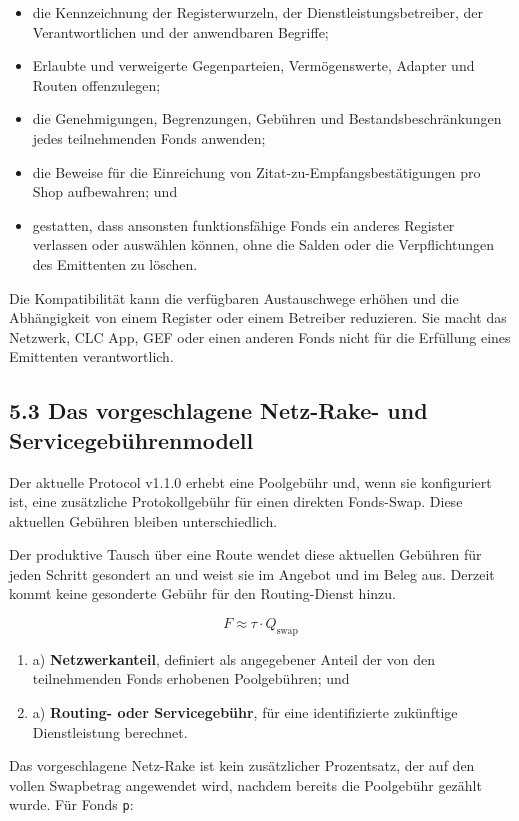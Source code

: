 \documentclass[11pt]{article}
\begin{document}
\begin{itemize}[leftmargin=*]
\item die Kennzeichnung der Registerwurzeln, der Dienstleistungsbetreiber, der Verantwortlichen und der anwendbaren Begriffe;
\item Erlaubte und verweigerte Gegenparteien, Vermögenswerte, Adapter und Routen offenzulegen;
\item die Genehmigungen, Begrenzungen, Gebühren und Bestandsbeschränkungen jedes teilnehmenden Fonds anwenden;
\item die Beweise für die Einreichung von Zitat-zu-Empfangsbestätigungen pro Shop aufbewahren; und
\item gestatten, dass ansonsten funktionsfähige Fonds ein anderes Register verlassen oder auswählen können, ohne die Salden oder die Verpflichtungen des Emittenten zu löschen.
\end{itemize}
Die Kompatibilität kann die verfügbaren Austauschwege erhöhen und die Abhängigkeit von einem Register oder einem Betreiber reduzieren. Sie macht das Netzwerk, CLC App, GEF oder einen anderen Fonds nicht für die Erfüllung eines Emittenten verantwortlich.

\subsection*{5.3 Das vorgeschlagene Netz-Rake- und Servicegebührenmodell}

Der aktuelle Protocol v1.1.0 erhebt eine Poolgebühr und, wenn sie konfiguriert ist, eine zusätzliche Protokollgebühr für einen direkten Fonds-Swap. Diese aktuellen Gebühren bleiben unterschiedlich.

Der produktive Tausch über eine Route wendet diese aktuellen Gebühren für jeden Schritt gesondert an und weist sie im Angebot und im Beleg aus. Derzeit kommt keine gesonderte Gebühr für den Routing-Dienst hinzu.

\[
F \approx \tau \cdot Q_{\mathrm{swap}}
\]

\begin{enumerate}[leftmargin=*]
\item a) \textbf{Netzwerkanteil}, definiert als angegebener Anteil der von den teilnehmenden Fonds erhobenen Poolgebühren; und
\item a) \textbf{Routing- oder Servicegebühr}, für eine identifizierte zukünftige Dienstleistung berechnet.
\end{enumerate}
Das vorgeschlagene Netz-Rake ist kein zusätzlicher Prozentsatz, der auf den vollen Swapbetrag angewendet wird, nachdem bereits die Poolgebühr gezählt wurde. Für Fonds \texttt{p}:
\end{document}
